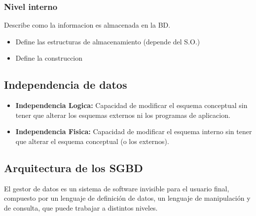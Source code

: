 \documentclass[twoside]{article}
\begin{document}
\subsubsection{Nivel interno}

Describe como la informacion es almacenada en la BD.

\begin{itemize}
  \item Define las estructuras de almacenamiento (depende del S.O.)
  \item Define la construccion
\end{itemize}

\subsection{Independencia de datos}

\begin{itemize}
  \item \textbf{Independencia Logica:} Capacidad de modificar el esquema conceptual sin tener que alterar los esquemas externos ni los programas de aplicacion.
  \item \textbf{Independencia Fisica:} Capacidad de modificar el esquema interno sin tener que alterar el esquema conceptual (o los externos).
\end{itemize}

\subsection{Arquitectura de los SGBD}

El gestor de datos es un sistema de software invisible para el usuario final, compuesto por un lenguaje de definición de datos, un lenguaje de manipulación y de consulta, que puede trabajar a distintos niveles. 
\end{document}
